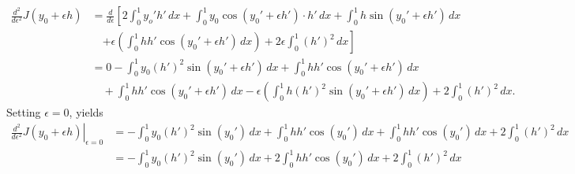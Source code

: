 \documentclass{article}
\begin{document}
\begin{equation*}
  \begin{split}
     \frac{d^2}{d\epsilon^2}J(y_0 + \epsilon h) 
     & = \frac{d}{d\epsilon}\left[2\int_0^1 y_o' h'\, dx +
  \int_0^1 y_0\cos(y_0' + \epsilon h')\cdot h'\, dx
   +  \int_0 ^1 h\sin(y_0'
      + \epsilon h')\, dx \right.\\
  &\quad\left.  + \epsilon\left(\int_0^1 hh'\cos(y_0' +
      \epsilon h')\, dx\right) +2\epsilon \int_0^1 (h')^2\, dx\right] \\
  &= 0 - \int_0^1 y_0 (h')^2\sin(y_0' + \epsilon h') \,dx + \int_0^1
  hh'\cos(y_0' + \epsilon h')\,dx\\
  &\quad +\int_0^1 hh'\cos(y_0' +
      \epsilon h')\, dx - \epsilon \left(\int_0^1 h(h')^2\sin(y_0' +
      \epsilon h')\, dx\right) + 2\int_0^1(h')^2\, dx.
  \end{split}
\end{equation*}
Setting $\epsilon = 0$, yields
\begin{equation*}
  \begin{split}
     \left. \frac{d^2}{d\epsilon^2}J(y_0 + \epsilon h)\right|_{\epsilon = 0} &=
 - \int_0^1 y_0 (h')^2\sin(y_0') \,dx + \int_0^1 hh'\cos(y_0')\,dx
 +\int_0^1 hh'\cos(y_0')\, dx + 2\int_0^1(h')^2\, dx\\
 &= - \int_0^1 y_0 (h')^2\sin(y_0') \,dx + 2\int_0^1 hh'\cos(y_0')\,dx
+ 2\int_0^1(h')^2\, dx\\
  \end{split}
\end{equation*}
\end{document}

